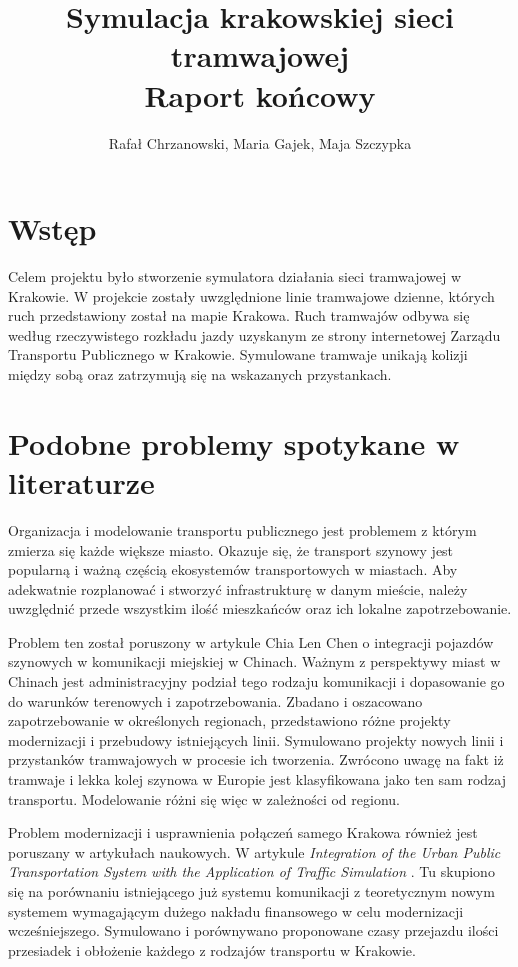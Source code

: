 \documentclass[12pt,a4paper]{article}
\author{Rafał Chrzanowski, Maria Gajek, Maja Szczypka}
\title{Symulacja krakowskiej sieci tramwajowej \\ \vspace{0.25cm} \Large Raport końcowy}
\begin{document}
    \maketitle

    \newpage

    \tableofcontents

    \newpage

    \section{Wstęp}
        Celem projektu było stworzenie symulatora działania sieci tramwajowej w Krakowie. W projekcie zostały uwzględnione linie tramwajowe dzienne, których ruch przedstawiony został na mapie Krakowa. Ruch tramwajów odbywa się według rzeczywistego rozkładu jazdy uzyskanym ze strony internetowej Zarządu Transportu Publicznego w Krakowie. Symulowane tramwaje unikają kolizji między sobą oraz zatrzymują się na wskazanych przystankach.

    \section{Podobne problemy spotykane w literaturze}
        Organizacja i modelowanie transportu publicznego jest problemem z którym zmierza się każde większe miasto. Okazuje się, że transport szynowy jest popularną i ważną częścią ekosystemów transportowych w miastach. Aby adekwatnie rozplanować i stworzyć infrastrukturę w danym mieście, należy uwzględnić przede wszystkim ilość mieszkańców oraz ich lokalne zapotrzebowanie.

        Problem ten został poruszony w artykule Chia Len Chen \cite{china_tram} o integracji pojazdów szynowych w komunikacji miejskiej w Chinach. Ważnym z perspektywy miast w Chinach jest administracyjny podział tego rodzaju komunikacji i dopasowanie go do warunków terenowych i zapotrzebowania. Zbadano i oszacowano zapotrzebowanie w określonych regionach, przedstawiono różne projekty modernizacji i przebudowy istniejących linii. Symulowano projekty nowych linii i przystanków tramwajowych w procesie ich tworzenia. Zwrócono uwagę na fakt iż tramwaje i lekka kolej szynowa w Europie jest klasyfikowana jako ten sam rodzaj transportu. Modelowanie różni się więc w zależności od regionu.

        Problem modernizacji i usprawnienia połączeń samego Krakowa również jest poruszany w artykułach naukowych. W artykule \textit{Integration of the Urban Public Transportation System with the Application of Traffic Simulation} \cite{krk_sim}. Tu skupiono się na porównaniu istniejącego już systemu komunikacji z teoretycznym nowym systemem wymagającym dużego nakładu finansowego w celu modernizacji wcześniejszego. Symulowano i porównywano proponowane czasy przejazdu ilości przesiadek i obłożenie każdego z rodzajów transportu w Krakowie.
\end{document}
